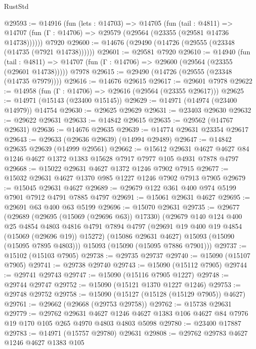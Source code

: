 \begin{lexlean}{RustStd}
\begin{coremodule}
@29593 := @14916
    (fun (lets : @14703) =>
    @14705
      (fun (tail : @4811) =>
      @14707 (fun (Γ : @14706) => @29579 (@29564 (@23355 (@29581 @14736 @14738))))))
    @7920
@29600 := @14676 (@29490 (@14726 (@29555 (@23348 (@14735 (@7921 @14738))))))
@29601 := @29581 @7920
@29610 := @14940
    (fun (tail : @4811) => @14707 (fun (Γ : @14706) => @29600 (@29564 (@23355 (@29601 @14738)))))
    @7978
@29615 := @29490 (@14726 (@29555 (@23348 (@14735 @7979))))
@29616 := @14676 @29615
@29617 := @29601 @7978
@29622 := @14958 (fun (Γ : @14706) => @29616 (@29564 (@23355 @29617)))
@29625 := @14971 (@15143 (@23400 @15145))
@29629 := @14971 (@14974 (@23400 @14979)) @14754
@29630 := @29625 @29629
@29631 := @23403 @29630
@29632 := @29622 @29631
@29633 := @14842 @29615
@29635 := @29562 (@14767 @29631)
@29636 := @14676 @29635
@29639 := @14774 @29631 @23354 @29617
@29643 := @29633 (@29636 @29639) (@14994 @29489)
@29647 := @14842 @29635 @29639 (@14999 @29561)
@29662 := @15612
    @29631
    @4627
    @4627
    @84
    @1246
    @4627
    @1372
    @1383
    @15628
    @7917
    @7977
    @105
    @4931
    @7878
    @4797
@29668 := @15022 @29631 @4627 @1372 @1246 @7902 @7915
@29677 := @15032 @29631 @4627 @1370 @985 @1227 @1246 @7902 @7913 @7905
@29679 := @15045 @29631 @4627
@29689 := @29679 @122 @361 @400 @974 @5199 @7901 @7912 @4791 @7885 @4797
@29691 := @15061 @29631 @4627
@29695 := @29691 @63 @400 @63 @5199
@29696 := @15070 @29631
@29735 := @29677
    (@29689
      (@29695 (@15069 (@29696 @63)) @17330)
      (@29679
        @140
        @124
        @400
        @25
        @4854
        @4803
        @4816
        @4791
        @7894
        @4797
        (@29691 @19 @400 @19 @4854 (@15069 (@29696 @19)) @15272)
        (@15086 @29631 @4627)
        @15093
        (@15090 (@15095 @7895 @4803)))
      @15093
      (@15090 (@15095 @7886 @7901)))
@29737 := @15102 (@15103 @7905)
@29738 := @29735 @29737
@29740 := @15090 (@15107 @7905)
@29741 := @29738 @29740
@29743 := @15090 (@15112 @7905)
@29744 := @29741 @29743
@29747 := @15090 (@15116 @7905 @1227)
@29748 := @29744 @29747
@29752 := @15090 (@15121 @1370 @1227 @1246)
@29753 := @29748 @29752
@29758 := @15090 (@15127 (@15128 (@15129 @7905)) @4627)
@29761 := @29662 (@29668 (@29753 @29758))
@29762 := @15738 @29631
@29779 := @29762
    @29631
    @4627
    @1246
    @4627
    @1383
    @106
    @4627
    @84
    @7976
    @19
    @170
    @105
    @265
    @4970
    @4803
    @4803
    @5098
@29780 := @23400 @17887
@29783 := @14971 (@15757 @29780) @29631
@29808 := @29762
    @29783
    @4627
    @1246
    @4627
    @1383
    @105

\end{coremodule}
\end{lexlean}
